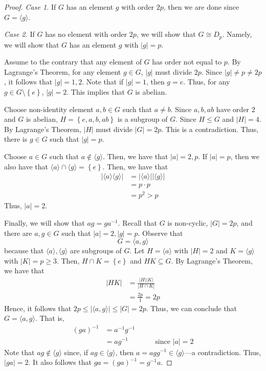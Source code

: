 \begin{proof}
    \phantom{woah}

    \textit{Case 1.} If \(G\) has an element \(g\) with order \(2p\), then we are done since \(G = \langle g \rangle\).

    \textit{Case 2.} If \(G\) has no element with order \(2p\), we will show that \(G \cong D_p\). Namely, we will show that \(G\) has an element \(g\) with \(|g| = p\).

    Assume to the contrary that any element of \(G\) has order not equal to \(p\). By Lagrange's Theorem, for any element \(g \in G\), \(|g|\) must divide \(2p\). Since \(|g| \neq p \neq 2p\), it follows that \(|g| = 1, 2\). Note that if \(|g|=1\), then \(g = e\). Thus, for any \(g \in G \setminus \left\{e\right\}\), \(|g| = 2\). This implies that \(G\) is abelian. 

    Choose non-identity element \(a, b \in G\) such that \(a \neq b\). Since \(a, b, ab\) have order 2 and \(G\) is abelian, \(H = \left\{e, a, b, ab\right\}\) is a subgroup of \(G\). Since \(H \leq G\) and \(|H| = 4\). By Lagrange's Theorem, \(|H|\) must divide \(|G| = 2p\). This is a contradiction. Thus, there is \(g \in G\) such that \(|g| = p\).

    Choose \(a \in G\) such that \(a \notin \langle g \rangle\). Then, we have that \(|a| = 2, p\). If \(|a| = p\), then we also have that \(\langle a \rangle \cap \langle g \rangle = \left\{e\right\}\). Then, we have that
    \[
    \begin{aligned}
        |\langle a \rangle\langle g \rangle|
            &= |\langle a \rangle||\langle g \rangle| \\
            &= p \cdot p \\
            &= p^2 > p
    \end{aligned}
    \]
    Thus, \(|a| = 2\).

    Finally, we will show that \(ag = ga^{-1}\). Recall that \(G\) is non-cyclic, \(|G| = 2p\), and there are \(a, g \in G\) such that \(|a| = 2, |g| = p\). Observe that
    \[
        G = \langle a, g \rangle
    \]
    because that \(\langle a \rangle, \langle g \rangle\) are subgroups of \(G\). Let \(H = \langle a \rangle\) with \(|H| = 2\) and \(K = \langle g \rangle\) with \(|K| = p \geq 3\). Then, \(H \cap K = \left\{e\right\}\) and \(HK \subseteq G\). By Lagrange's Theorem, we have that
    \[
    \begin{aligned}
        |HK| &= \frac{|H||K|}{|H \cap K|} \\
             &= \frac{2p}{1} = 2p
    \end{aligned}
    \]
    Hence, it follows that \(2p \leq |\langle a, g \rangle| \leq |G| = 2p\). Thus, we can conclude that \(G = \langle a, g \rangle\). That is,
    \[
    \begin{aligned}
        (ga)^{-1} &= a^{-1}g^{-1} \\
                  &= ag^{-1} &\qquad\text{since \(|a| = 2\)}
    \end{aligned}
    \]
    Note that \(ag \notin \langle g \rangle\) since, if \(ag \in \langle g \rangle\), then \(a = agg^{-1} \in \langle g \rangle\)---a contradiction. Thus, \(|ga| = 2\). It also follows that \(ga = (ga)^{-1} = g^{-1}a\).


\end{proof}
